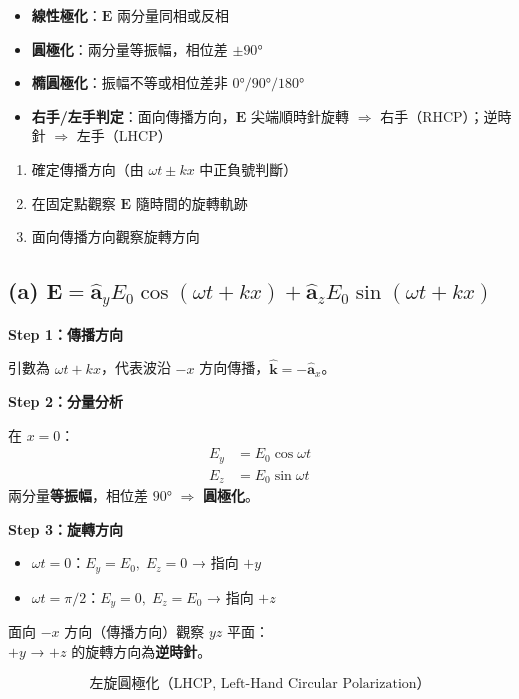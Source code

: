 \documentclass[12pt,a4paper]{article}
\newcommand{\vE}{\mathbf{E}}
\newcommand{\vk}{\mathbf{k}}
\newcommand{\ax}{\hat{\mathbf{a}}_x}
\newcommand{\ay}{\hat{\mathbf{a}}_y}
\newcommand{\az}{\hat{\mathbf{a}}_z}
\begin{document}
\begin{conceptbox}[核心概念]
\begin{itemize}
  \item \textbf{線性極化}：$\vE$ 兩分量同相或反相
  \item \textbf{圓極化}：兩分量等振幅，相位差 $\pm 90°$
  \item \textbf{橢圓極化}：振幅不等或相位差非 $0°/90°/180°$
  \item \textbf{右手/左手判定}：面向傳播方向，$\vE$ 尖端順時針旋轉 $\Rightarrow$ 右手（RHCP）；逆時針 $\Rightarrow$ 左手（LHCP）
\end{itemize}
\end{conceptbox}

\begin{formulabox}[判定步驟]
\begin{enumerate}
  \item 確定傳播方向（由 $\omega t \pm kx$ 中正負號判斷）
  \item 在固定點觀察 $\vE$ 隨時間的旋轉軌跡
  \item 面向傳播方向觀察旋轉方向
\end{enumerate}
\end{formulabox}

\subsection*{(a) $\vE = \ay E_0\cos(\omega t + kx) + \az E_0\sin(\omega t + kx)$}

\begin{solutionbox}[詳解]

\textbf{Step 1：傳播方向}

引數為 $\omega t + kx$，代表波沿 $-x$ 方向傳播，$\hat{\vk} = -\ax$。

\textbf{Step 2：分量分析}

在 $x = 0$：
\begin{align*}
  E_y &= E_0\cos\omega t \\
  E_z &= E_0\sin\omega t
\end{align*}
兩分量\textbf{等振幅}，相位差 $90°$ $\Rightarrow$ \textbf{圓極化}。

\textbf{Step 3：旋轉方向}

\begin{itemize}
  \item $\omega t = 0$：$E_y = E_0,\; E_z = 0$ → 指向 $+y$
  \item $\omega t = \pi/2$：$E_y = 0,\; E_z = E_0$ → 指向 $+z$
\end{itemize}

面向 $-x$ 方向（傳播方向）觀察 $yz$ 平面：\\
$+y$ → $+z$ 的旋轉方向為\textbf{逆時針}。

\[
  \boxed{\text{左旋圓極化（LHCP, Left-Hand Circular Polarization）}}
\]
\end{solutionbox}
\end{document}
